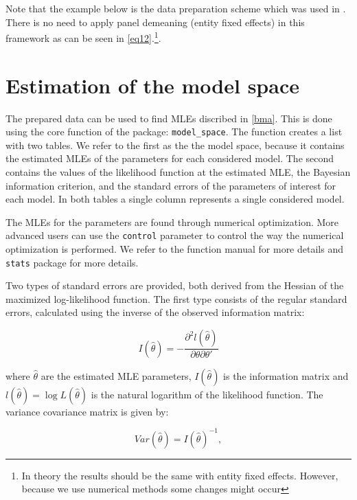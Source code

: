 \documentclass[a4paper]{article}
\begin{document}
\noindent Note that the example below is the data preparation scheme which was
used in \citet{Moral+2016}.
There is no need to apply panel demeaning (entity fixed effects)
in this framework as can be seen in \autoref{eq12}.\footnote{
In theory the results should be the same with entity fixed effects.
However, because we use numerical methods some changes might occur}.


\section{Estimation of the model space}\label{model_space}

The prepared data can be used to find MLEs discribed in \autoref{bma}.
This is done using the core function of the package: \verb+model_space+.
The function creates a list with two tables.
We refer to the first as the the model space,
because it contains the estimated MLEs of the parameters for each considered model.
The second contains the values of the likelihood function at the estimated MLE,
the Bayesian information criterion,
and the standard errors of the parameters of interest for each model.
In both tables a single column represents a single considered model.

The MLEs for the parameters are found through numerical optimization.
More advanced users can use the \verb+control+ parameter to control the way the numerical optimization is performed.
We refer to the function manual for more details and \verb+stats+ package for more details.

Two types of standard errors are provided,
both derived from the Hessian of the maximized log-likelihood function.
The first type consists of the regular standard errors,
calculated using the inverse of the observed information matrix:

\begin{equation}
I(\hat{\theta}) = -\frac{\partial^2 l(\hat{\theta})}{\partial \theta \partial \theta'}
\end{equation}

\noindent where $\hat{\theta}$ are the estimated MLE parameters,
$I(\hat{\theta})$ is the information matrix
and $l(\hat{\theta}) = \log L(\hat{\theta})$ is the natural logarithm of the likelihood function.
The variance covariance matrix is given by:

\begin{equation}
Var(\hat{\theta}) = I(\hat{\theta})^{-1},
\end{equation}
\end{document}
